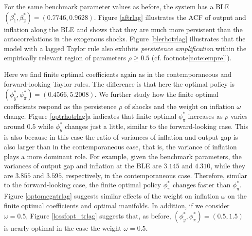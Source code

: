 For the same benchmark parameter values as before, the system has a BLE $(\beta_1^*,\beta_2^*)=(0.7746, 0.9628)$. Figure \ref{aftrlag} illustrates the ACF of output and inflation along the BLE and shows that they are much more persistent than the autocorrelations in the exogenous shocks. Figure \ref{blerhotrlag} illustrates that the model with a lagged Taylor rule also exhibits {\it persistence amplification} within the empirically relevant region of parameters $\rho\geq 0.5$ (cf. footnote\ref{note:emprel}).


Here we find finite optimal coefficients again as in the contemporaneous and forward-looking Taylor rules. The difference is that here the optimal policy is $(\phi_y^*, \phi_\pi^*)=(0.4566, 5.2008)$. We further study how the finite optimal coefficients respond as the persistence $\rho$ of shocks and the weight on inflation $\omega$ change. Figure \ref{optrhotrlag}a indicates that finite optimal $\phi_\pi^*$ increases as $\rho$ varies around $0.5$ while $\phi_y^*$ changes just a little, similar to the forward-looking case. This is also because in this case the ratio of variances of inflation and output gap is also larger than in the contemporaneous case, that is, the variance of inflation plays a more dominant role.  For example, given the benchmark parameters, the variances of output gap and inflation at the BLE are $3.145$ and $4.310$, while they are $3.855$ and $3.595$, respectively, in the contemporaneous case. Therefore, similar to the forward-looking case, the finite optimal policy $\phi_\pi^*$  changes faster than $\phi_y^*$. Figure \ref{optomegatrlag} suggests similar effects of the weight on inflation $\omega$ on the finite optimal coefficients and optimal manifolds. In addition, if we consider $\omega=0.5$, Figure \ref{lossfopt_trlag} suggests that, as before, $(\phi_y^*,\phi_\pi^*)=(0.5, 1.5)$ is nearly optimal in the case the weight $\omega=0.5$.

